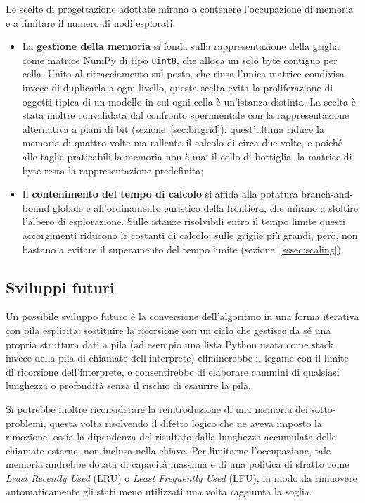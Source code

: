 Le scelte di progettazione adottate mirano a contenere l'occupazione di memoria e a limitare il numero di nodi esplorati:
\begin{itemize}
    \item La \textbf{gestione della memoria} si fonda sulla rappresentazione della griglia come matrice NumPy di tipo \texttt{uint8}, che alloca un solo byte contiguo per cella. Unita al ritracciamento sul posto, che riusa l'unica matrice condivisa invece di duplicarla a ogni livello, questa scelta evita la proliferazione di oggetti tipica di un modello in cui ogni cella è un'istanza distinta. La scelta è stata inoltre convalidata dal confronto sperimentale con la rappresentazione alternativa a piani di bit (sezione~\ref{sec:bitgrid}): quest'ultima riduce la memoria di quattro volte ma rallenta il calcolo di circa due volte, e poiché alle taglie praticabili la memoria non è mai il collo di bottiglia, la matrice di byte resta la rappresentazione predefinita;

    \item Il \textbf{contenimento del tempo di calcolo} si affida alla potatura branch-and-bound globale e all'ordinamento euristico della frontiera, che mirano a sfoltire l'albero di esplorazione. Sulle istanze risolvibili entro il tempo limite questi accorgimenti riducono le costanti di calcolo; sulle griglie più grandi, però, non bastano a evitare il superamento del tempo limite (sezione~\ref{sssec:scaling}).
\end{itemize}

\subsection{Sviluppi futuri}

Un possibile sviluppo futuro è la conversione dell'algoritmo in una forma iterativa con pila esplicita: sostituire la ricorsione con un ciclo che gestisce da sé una propria struttura dati a pila (ad esempio una lista Python usata come stack, invece della pila di chiamate dell'interprete) eliminerebbe il legame con il limite di ricorsione dell'interprete, e consentirebbe di elaborare cammini di qualsiasi lunghezza o profondità senza il rischio di esaurire la pila.

Si potrebbe inoltre riconsiderare la reintroduzione di una memoria dei sotto-problemi, questa volta risolvendo il difetto logico che ne aveva imposto la rimozione, ossia la dipendenza del risultato dalla lunghezza accumulata delle chiamate esterne, non inclusa nella chiave. Per limitarne l'occupazione, tale memoria andrebbe dotata di capacità massima e di una politica di sfratto come \textit{Least Recently Used} (LRU) o \textit{Least Frequently Used} (LFU), in modo da rimuovere automaticamente gli stati meno utilizzati una volta raggiunta la soglia.
